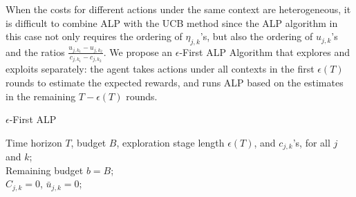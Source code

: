 When the costs for different actions under the same context are heterogeneous, it is difficult to combine ALP with the UCB method since the ALP algorithm in this case not only requires the ordering of $\eta_{j,k}$'s, but also the ordering of $u_{j,k}$'s and the ratios $\frac{u_{j,k_1} - u_{j, k_2}}{c_{j,k_1} - c_{j, k_2}}$.
We propose an $\epsilon$-First ALP Algorithm that explores and exploits separately: the agent takes actions under all contexts in the first $\epsilon(T)$ rounds to estimate the expected rewards, and runs ALP based on the estimates in the remaining $T-\epsilon(T)$ rounds.

\begin{algorithm}[htbp]
\caption{$\epsilon$-First ALP}
\label{alg:eps_first_alp}
\begin{algorithmic}
 Time horizon $T$, budget $B$, exploration stage length $\epsilon(T)$, and $c_{j,k}$'s, for all $j$ and $k$;\\
 Remaining budget $b = B$;\\
$C_{j,k} = 0$, $\bar{u}_{j,k} = 0$;
\ENDIF
\ENDFOR
{}
\ENDIF
\ENDFOR
\end{algorithmic}
\end{algorithm}

